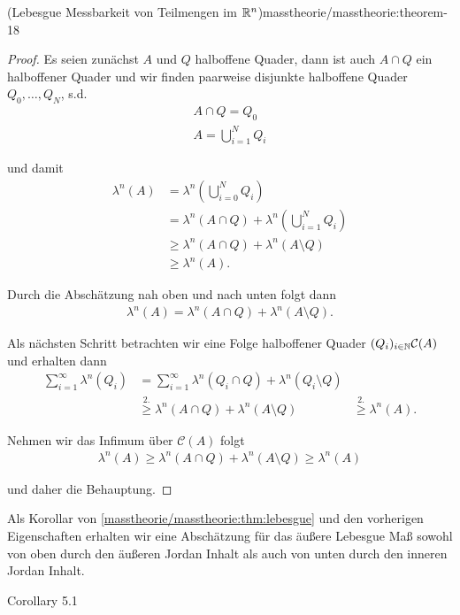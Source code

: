 \begin{theorem}{(Lebesgue Messbarkeit von Teilmengen im \protect\(\mathbb{R}^n\protect\))}{masstheorie/masstheorie:theorem-18}
\begin{proof}
\par
Es seien zunächst \(A\) und \(Q\) halboffene Quader, dann ist auch \(A\cap Q\) ein halboffener Quader und wir finden paarweise disjunkte halboffene Quader \(Q_0,\ldots,Q_N\), s.d.
\begin{align*}
A\cap Q = Q_0\\
A = \bigcup_{i=1}^N Q_i
\end{align*}
\par
und damit
\begin{align*}
\lambda^n(A) &= \lambda^n\left(\bigcup_{i=0}^N Q_i\right)\\
&= 
\lambda^n(A\cap Q) + \lambda^n\left(\bigcup_{i=1}^N Q_i\right)\\
&\geq \lambda^n(A\cap Q) + \lambda^n(A\setminus Q) \\
&\geq \lambda^n(A).
\end{align*}
\par
Durch die Abschätzung nah oben und nach unten folgt dann
\begin{align*}
\lambda^n(A) = \lambda^n(A\cap Q) + \lambda^n(A\setminus Q).
\end{align*}
\par
Als nächsten Schritt betrachten wir eine Folge halboffener Quader \((Q_i)_{i\in\mathbb{N}}\mathcal{C}(A)\) und erhalten dann
\begin{align*}
\sum_{i=1}^\infty \lambda^n(Q_i) &= 
\sum_{i=1}^\infty \lambda^n(Q_i\cap Q) + \lambda^n(Q_i\setminus Q)\\
&\overset{2.}{\geq}
\lambda^n(A\cap Q) + \lambda^n(A\setminus Q)
&\overset{2.}{\geq}
\lambda^n(A).
\end{align*}
\par
Nehmen wir das Infimum über \(\mathcal{C}(A)\) folgt
\begin{align*}
\lambda^n(A) \geq \lambda^n(A\cap Q) + \lambda^n(A\setminus Q) \geq 
\lambda^n(A)
\end{align*}
\par
und daher die Behauptung.
\end{proof}

\par
Als Korollar von \cref{masstheorie/masstheorie:thm:lebesgue} und den vorherigen Eigenschaften erhalten wir eine Abschätzung für das äußere Lebesgue Maß sowohl von oben durch den äußeren Jordan Inhalt als auch von unten durch den inneren Jordan Inhalt.
\label{masstheorie/masstheorie:corollary-25}
\begin{emphBox}{}{}{Corollary 5.1}




\end{emphBox}
\end{theorem}
